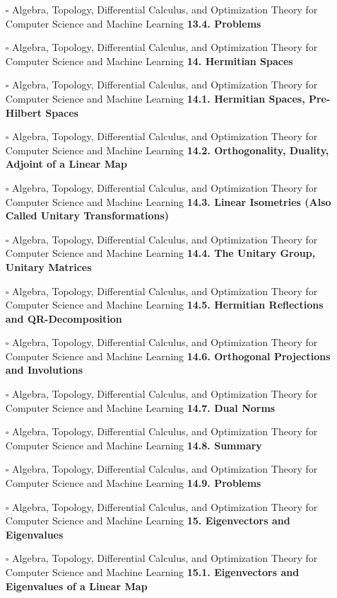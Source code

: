 \documentclass[a4, landscape, 12pt]{article}
\newcommand{\checkbox}{$\square$}%
\begin{document}
\begin{itemize}
{}
\item [\checkbox]  Algebra, Topology, Differential Calculus, and Optimization Theory for Computer Science and Machine Learning \textbf{ 13.4. Problems
}
\item [\checkbox]  Algebra, Topology, Differential Calculus, and Optimization Theory for Computer Science and Machine Learning \textbf{ 14. Hermitian Spaces
}
\item [\checkbox]  Algebra, Topology, Differential Calculus, and Optimization Theory for Computer Science and Machine Learning \textbf{ 14.1. Hermitian Spaces, Pre-Hilbert Spaces
}
\item [\checkbox]  Algebra, Topology, Differential Calculus, and Optimization Theory for Computer Science and Machine Learning \textbf{ 14.2. Orthogonality, Duality, Adjoint of a Linear Map
}
\item [\checkbox]  Algebra, Topology, Differential Calculus, and Optimization Theory for Computer Science and Machine Learning \textbf{ 14.3. Linear Isometries (Also Called Unitary Transformations)
}
\item [\checkbox]  Algebra, Topology, Differential Calculus, and Optimization Theory for Computer Science and Machine Learning \textbf{ 14.4. The Unitary Group, Unitary Matrices
}
\item [\checkbox]  Algebra, Topology, Differential Calculus, and Optimization Theory for Computer Science and Machine Learning \textbf{ 14.5. Hermitian Reflections and QR-Decomposition
}
\item [\checkbox]  Algebra, Topology, Differential Calculus, and Optimization Theory for Computer Science and Machine Learning \textbf{ 14.6. Orthogonal Projections and Involutions
}
\item [\checkbox]  Algebra, Topology, Differential Calculus, and Optimization Theory for Computer Science and Machine Learning \textbf{ 14.7. Dual Norms
}
\item [\checkbox]  Algebra, Topology, Differential Calculus, and Optimization Theory for Computer Science and Machine Learning \textbf{ 14.8. Summary
}
\item [\checkbox]  Algebra, Topology, Differential Calculus, and Optimization Theory for Computer Science and Machine Learning \textbf{ 14.9. Problems
}
\item [\checkbox]  Algebra, Topology, Differential Calculus, and Optimization Theory for Computer Science and Machine Learning \textbf{ 15. Eigenvectors and Eigenvalues
}
\item [\checkbox]  Algebra, Topology, Differential Calculus, and Optimization Theory for Computer Science and Machine Learning \textbf{ 15.1. Eigenvectors and Eigenvalues of a Linear Map
}
\end{itemize}
\end{document}
